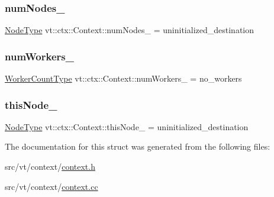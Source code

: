 \subsubsection{\texorpdfstring{num\+Nodes\+\_\+}{numNodes\_}}
{\footnotesize\ttfamily \hyperlink{namespacevt_a866da9d0efc19c0a1ce79e9e492f47e2}{Node\+Type} vt\+::ctx\+::\+Context\+::num\+Nodes\+\_\+ = uninitialized\+\_\+destination\hspace{0.3cm}{\ttfamily [private]}}

\mbox{\label{structvt_1_1ctx_1_1_context_a16e8488c6e6ad26c387ad6ef19f726b9}} 
\subsubsection{\texorpdfstring{num\+Workers\+\_\+}{numWorkers\_}}
{\footnotesize\ttfamily \hyperlink{namespacevt_aa93398ea48f2cb6c188512250f7cc248}{Worker\+Count\+Type} vt\+::ctx\+::\+Context\+::num\+Workers\+\_\+ = no\+\_\+workers\hspace{0.3cm}{\ttfamily [private]}}

\mbox{\label{structvt_1_1ctx_1_1_context_a5fcea79d2fede6e9945433621894624c}} 
\subsubsection{\texorpdfstring{this\+Node\+\_\+}{thisNode\_}}
{\footnotesize\ttfamily \hyperlink{namespacevt_a866da9d0efc19c0a1ce79e9e492f47e2}{Node\+Type} vt\+::ctx\+::\+Context\+::this\+Node\+\_\+ = uninitialized\+\_\+destination\hspace{0.3cm}{\ttfamily [private]}}



The documentation for this struct was generated from the following files\+:\begin{DoxyCompactItemize}
\item 
src/vt/context/\hyperlink{context_8h}{context.\+h}\item 
src/vt/context/\hyperlink{context_8cc}{context.\+cc}\end{DoxyCompactItemize}
